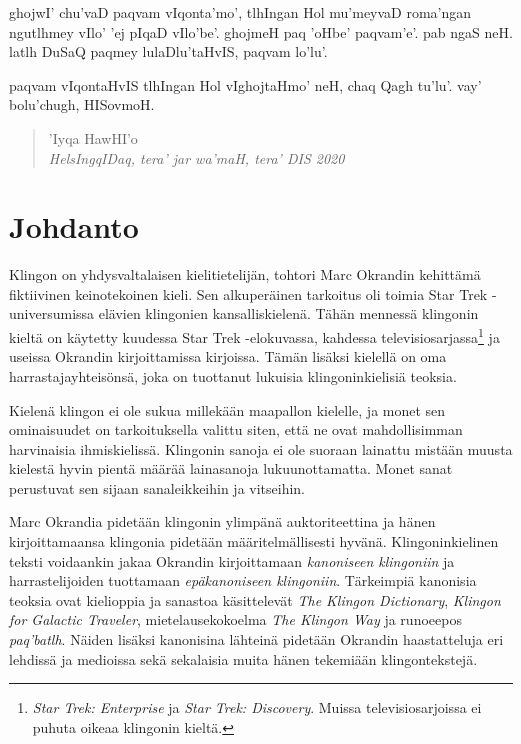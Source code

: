 \documentclass{book}
\begin{document}
ghojwI' chu'vaD paqvam vIqonta'mo', tlhIngan Hol mu'meyvaD roma'ngan ngutlhmey vIlo' 'ej pIqaD vIlo'be'.
ghojmeH paq 'oHbe' paqvam'e'. pab ngaS neH. latlh DuSaQ paqmey lulaDlu'taHvIS, paqvam lo'lu'.

paqvam vIqontaHvIS tlhIngan Hol vIghojtaHmo' neH, chaq Qagh tu'lu'.
vay' bolu'chugh, HISovmoH.

\begin{quote}
    'Iyqa HawHI'o \\
    \textit{HelsIngqIDaq, tera' jar wa'maH, tera' DIS 2020}
\end{quote}

\tableofcontents

\mainmatter

\chapter{Johdanto}

Klingon on yhdysvaltalaisen kielitietelijän, tohtori Marc Okrandin kehittämä fiktiivinen keinotekoinen kieli. Sen alkuperäinen tarkoitus oli toimia Star Trek -universumissa elävien klingonien kansalliskielenä. Tähän mennessä klingonin kieltä on käytetty kuudessa Star Trek -elokuvassa, kahdessa televisiosarjassa\footnote{\textit{Star Trek: Enterprise} ja \textit{Star Trek: Discovery}. Muissa televisiosarjoissa ei puhuta oikeaa klingonin kieltä.} ja useissa Okrandin kirjoittamissa kirjoissa. Tämän lisäksi kielellä on oma harrastajayhteisönsä, joka on tuottanut lukuisia klingoninkielisiä teoksia.

Kielenä klingon ei ole sukua millekään maapallon kielelle, ja monet sen ominaisuudet on tarkoituksella valittu siten, että ne ovat mahdollisimman harvinaisia ihmiskielissä. Klingonin sanoja ei ole suoraan lainattu mistään muusta kielestä hyvin pientä määrää lainasanoja lukuunottamatta. Monet sanat perustuvat sen sijaan sanaleikkeihin ja vitseihin.

Marc Okrandia pidetään klingonin ylimpänä auktoriteettina ja hänen kirjoittamaansa klingonia pidetään määritelmällisesti hyvänä. Klingoninkielinen teksti voidaankin jakaa Okrandin kirjoittamaan \textit{kanoniseen klingoniin} ja harrastelijoiden tuottamaan \textit{epäkanoniseen klingoniin}. Tärkeimpiä kanonisia teoksia ovat kielioppia ja sanastoa käsittelevät \textit{The Klingon Dictionary}, \textit{Klingon for Galactic Traveler}, mietelausekokoelma \textit{The Klingon Way} ja runoeepos \textit{paq'batlh}. Näiden lisäksi kanonisina lähteinä pidetään Okrandin haastatteluja eri lehdissä ja medioissa sekä sekalaisia muita hänen tekemiään klingontekstejä.
\end{document}
